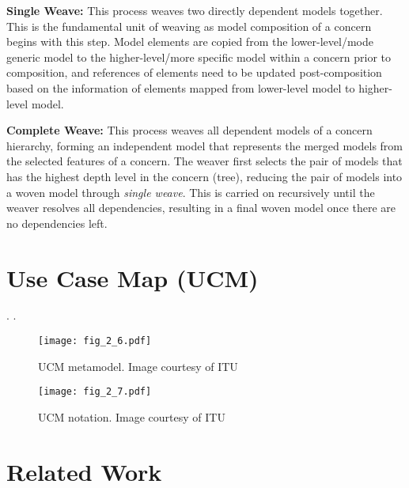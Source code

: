 \textbf{Single Weave:} This process weaves two directly dependent models together. This is the fundamental unit of weaving as model composition of a concern begins with this step. Model elements are copied from the lower-level/mode generic model to the higher-level/more specific model within a concern prior to composition, and references of elements need to be updated post-composition based on the information of elements mapped from lower-level model to higher-level model.

\textbf{Complete Weave:} This process weaves all dependent models of a concern hierarchy, forming an independent model that represents the merged models from the selected features of a concern. The weaver first selects the pair of models that has the highest depth level in the concern (tree), reducing the pair of models into a woven model through \emph{single weave}. This is carried on recursively until the weaver resolves all dependencies, resulting in a final woven model once there are no dependencies left.

\section{Use Case Map (UCM)} \label{sec:2.2}

.
.

\begin{figure}
	\centering
	\texttt{[image: fig\_2\_6.pdf]}
	\caption[UCM metamodel]{UCM metamodel. Image courtesy of ITU~\cite{itu2012151}}
	\label{fig:2.6}
\end{figure}

\begin{figure}
	\centering
	\texttt{[image: fig\_2\_7.pdf]}
	\caption[UCM notation]{UCM notation. Image courtesy of ITU~\cite{itu2012151}}
	\label{fig:2.7}
\end{figure}

\section{Related Work} \label{sec:2.3}


